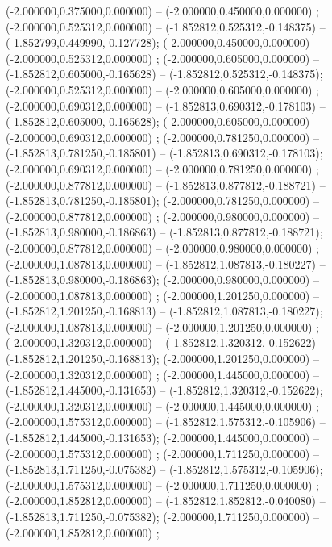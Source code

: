  (-2.000000,0.375000,0.000000) -- (-2.000000,0.450000,0.000000) ;
 (-2.000000,0.525312,0.000000) -- (-1.852812,0.525312,-0.148375) -- (-1.852799,0.449990,-0.127728);
 (-2.000000,0.450000,0.000000) -- (-2.000000,0.525312,0.000000) ;
 (-2.000000,0.605000,0.000000) -- (-1.852812,0.605000,-0.165628) -- (-1.852812,0.525312,-0.148375);
 (-2.000000,0.525312,0.000000) -- (-2.000000,0.605000,0.000000) ;
 (-2.000000,0.690312,0.000000) -- (-1.852813,0.690312,-0.178103) -- (-1.852812,0.605000,-0.165628);
 (-2.000000,0.605000,0.000000) -- (-2.000000,0.690312,0.000000) ;
 (-2.000000,0.781250,0.000000) -- (-1.852813,0.781250,-0.185801) -- (-1.852813,0.690312,-0.178103);
 (-2.000000,0.690312,0.000000) -- (-2.000000,0.781250,0.000000) ;
 (-2.000000,0.877812,0.000000) -- (-1.852813,0.877812,-0.188721) -- (-1.852813,0.781250,-0.185801);
 (-2.000000,0.781250,0.000000) -- (-2.000000,0.877812,0.000000) ;
 (-2.000000,0.980000,0.000000) -- (-1.852813,0.980000,-0.186863) -- (-1.852813,0.877812,-0.188721);
 (-2.000000,0.877812,0.000000) -- (-2.000000,0.980000,0.000000) ;
 (-2.000000,1.087813,0.000000) -- (-1.852812,1.087813,-0.180227) -- (-1.852813,0.980000,-0.186863);
 (-2.000000,0.980000,0.000000) -- (-2.000000,1.087813,0.000000) ;
 (-2.000000,1.201250,0.000000) -- (-1.852812,1.201250,-0.168813) -- (-1.852812,1.087813,-0.180227);
 (-2.000000,1.087813,0.000000) -- (-2.000000,1.201250,0.000000) ;
 (-2.000000,1.320312,0.000000) -- (-1.852812,1.320312,-0.152622) -- (-1.852812,1.201250,-0.168813);
 (-2.000000,1.201250,0.000000) -- (-2.000000,1.320312,0.000000) ;
 (-2.000000,1.445000,0.000000) -- (-1.852812,1.445000,-0.131653) -- (-1.852812,1.320312,-0.152622);
 (-2.000000,1.320312,0.000000) -- (-2.000000,1.445000,0.000000) ;
 (-2.000000,1.575312,0.000000) -- (-1.852812,1.575312,-0.105906) -- (-1.852812,1.445000,-0.131653);
 (-2.000000,1.445000,0.000000) -- (-2.000000,1.575312,0.000000) ;
 (-2.000000,1.711250,0.000000) -- (-1.852813,1.711250,-0.075382) -- (-1.852812,1.575312,-0.105906);
 (-2.000000,1.575312,0.000000) -- (-2.000000,1.711250,0.000000) ;
 (-2.000000,1.852812,0.000000) -- (-1.852812,1.852812,-0.040080) -- (-1.852813,1.711250,-0.075382);
 (-2.000000,1.711250,0.000000) -- (-2.000000,1.852812,0.000000) ;
